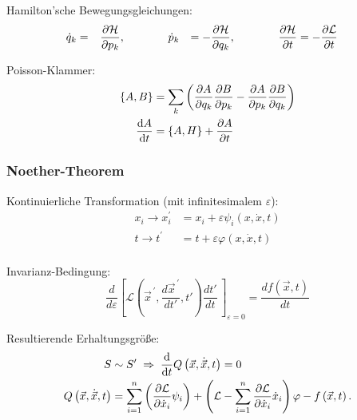 			\noindent
			Hamilton'sche Bewegungsgleichungen:
			\begin{equation}
				\begin{aligned}
					\dot{q}_k &= \phantom{-}\frac{\partial \mathcal{H}}{\partial p_k}, &&\hspace{30pt}
					\dot{p}_k &= -\frac{\partial \mathcal{H}}{\partial q_k}, &&\hspace{30pt}
					\frac{\partial \mathcal{H}}{\partial t} &= -\frac{\partial \mathcal{L}}{\partial t}
				\end{aligned}
			\end{equation}

			\noindent
			Poisson-Klammer:
			\begin{equation}
				\begin{aligned}
					\lbrace A, B \rbrace &= \sum_k \left(
						\frac{\partial A}{\partial q_k}\frac{\partial B}{\partial p_k} - \frac{\partial A}{\partial p_k}\frac{\partial B}{\partial q_k}
					\right) \\
					\frac{\mathrm{d} A}{\mathrm{d} t} &= \left\lbrace A, H \right\rbrace + \frac{\partial A}{\partial t}
				\end{aligned}
			\end{equation}

		\subsubsection{Noether-Theorem}
			\noindent
			Kontinuierliche Transformation (mit infinitesimalem $\varepsilon$):
			\begin{equation}
				\begin{aligned}
				x_i \rightarrow x_{i}^{\prime} &= x_i+\varepsilon\psi_i\left(x,\dot{x},t\right) \\
					t\rightarrow t^{\prime}\, &= t+\varepsilon\varphi\left(x,\dot{x},t\right) \\
				\end{aligned}
			\end{equation}

			\noindent
			Invarianz-Bedingung:
			\begin{equation}
				\frac{d}{d\varepsilon}\left[\mathcal{L}\left( {\vec{x}}^{\,\prime},\frac{d {\vec{x}}^{\,\prime}}{dt'},t'\right) \frac{dt'}{dt}\,\right]_{\varepsilon=0}=\frac{df(\vec{x}, t)}{dt}
			\end{equation}

			\noindent
			Resultierende Erhaltungsgröße:
			\begin{equation}
				\begin{aligned}
					S &\sim S' \;\Rightarrow\;
					\frac{\mathrm{d} }{\mathrm{d} t} Q\left(\vec{x},\dot{\vec{x}},t\right) = 0 \\
					Q\left(\vec{x},\dot{\vec{x}},t\right) &= \sum_{i=1}^{n}\left(\frac{\partial\mathcal{L}}{\partial{\dot{x}}_i}\psi_i\right)+\left(\mathcal{L}-\sum_{i=1}^{n}{\frac{\partial\mathcal{L}}{\partial{\dot{x}}_i}{\dot{x}}_i}\right)\varphi - f\left(\vec{x},t\right).
				\end{aligned}
			\end{equation}

